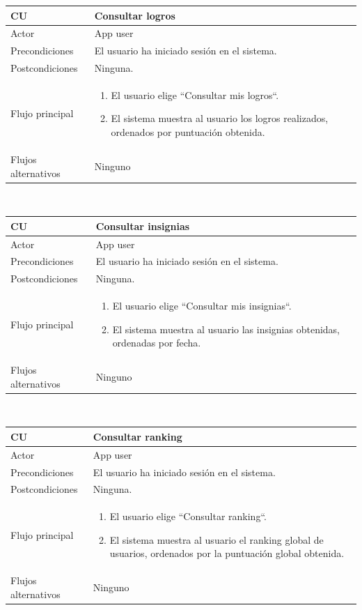 \documentclass[twoside]{report}
\newcommand\addrow[2]{#1 &#2\\ }
\newcommand\addheading[2]{#1 &#2\\ \hline}
\newcommand\tabularhead{\begin{tabular}{lp{0.7\textwidth}}
\hline
}
\newenvironment{usecase}{\tabularhead}
{\hline\end{tabular}}
\begin{document}
\begin{usecase}
  \addheading{\textbf{CU\arabic{usecase}}}{Consultar logros} 
  \addrow{Actor}{App user}
  \addrow{Precondiciones}{El usuario ha iniciado sesión en el sistema.}
  \addrow{Postcondiciones}{Ninguna.}
  \addrow{Flujo principal}{
  		\begin{enumerate}
  		\item El usuario elige “Consultar mis logros“.
  		\item El sistema muestra al usuario los logros realizados, ordenados por puntuación obtenida.
  		\end{enumerate}
  }
  \addrow{Flujos alternativos}{Ninguno}
\end{usecase}\\

\vspace{0.5cm}

\begin{usecase}
  \addheading{\textbf{CU\arabic{usecase}}}{Consultar insignias} 
  \addrow{Actor}{App user}
  \addrow{Precondiciones}{El usuario ha iniciado sesión en el sistema.}
  \addrow{Postcondiciones}{Ninguna.}
  \addrow{Flujo principal}{
  		\begin{enumerate}
  		\item El usuario elige “Consultar mis insignias“.
  		\item El sistema muestra al usuario las insignias obtenidas, ordenadas por fecha.
  		\end{enumerate}
  }
  \addrow{Flujos alternativos}{Ninguno}
\end{usecase}\\

\vspace{0.5cm}

\begin{usecase}
  \addheading{\textbf{CU\arabic{usecase}}}{Consultar ranking} 
  \addrow{Actor}{App user}
  \addrow{Precondiciones}{El usuario ha iniciado sesión en el sistema.}
  \addrow{Postcondiciones}{Ninguna.}
  \addrow{Flujo principal}{
  		\begin{enumerate}
  		\item El usuario elige “Consultar ranking“.
  		\item El sistema muestra al usuario el ranking global de usuarios, ordenados por la puntuación global obtenida.
  		\end{enumerate}
  }
  \addrow{Flujos alternativos}{Ninguno}
\end{usecase}\\
\end{document}
